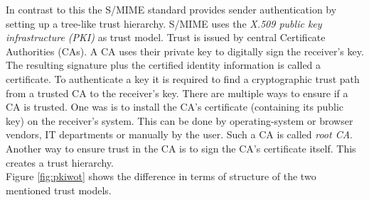 In contrast to this the S/MIME standard \citep{RFC5751} provides sender authentication by setting up a tree-like trust hierarchy. S/MIME uses the \textit{X.509 public key infrastructure (PKI)} \citep{RFC5280} as trust model. Trust is issued by central Certificate Authorities (CAs). A CA uses their private key to digitally sign the receiver's key. The resulting signature plus the certified identity information is called a certificate. To authenticate a key it is required to find a cryptographic trust path from a trusted CA to the receiver's key. There are multiple ways to ensure if a CA is trusted. One was is to install the CA's certificate (containing its public key) on the receiver's system. This can be done by operating-system or browser vendors, IT departments or manually by the user. Such a CA is called \textit{root CA}. Another way to ensure trust in the CA is to sign the CA's certificate itself. This creates a trust hierarchy. \\

Figure \ref{fig:pkiwot} shows the difference in terms of structure of the two mentioned trust models.

